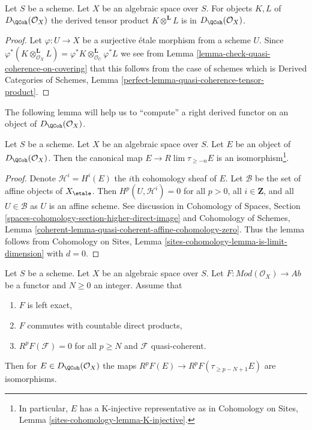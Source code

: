 \begin{lemma}
\label{lemma-quasi-coherence-tensor-product}
Let $S$ be a scheme. Let $X$ be an algebraic space over $S$.
For objects $K, L$ of $D_\QCoh(\mathcal{O}_X)$
the derived tensor product $K \otimes^\mathbf{L} L$ is in
$D_\QCoh(\mathcal{O}_X)$.
\end{lemma}

\begin{proof}
Let $\varphi : U \to X$ be a surjective \'etale morphism from a scheme $U$.
Since
$\varphi^*(K \otimes_{\mathcal{O}_X}^\mathbf{L} L) =
\varphi^*K \otimes_{\mathcal{O}_U}^\mathbf{L} \varphi^*L$
we see from
Lemma \ref{lemma-check-quasi-coherence-on-covering}
that this follows from the case of schemes which is
Derived Categories of Schemes, Lemma
\ref{perfect-lemma-quasi-coherence-tensor-product}.
\end{proof}

\noindent
The following lemma will help us to ``compute'' a right derived functor
on an object of $D_\QCoh(\mathcal{O}_X)$.

\begin{lemma}
\label{lemma-nice-K-injective}
Let $S$ be a scheme. Let $X$ be an algebraic space over $S$. Let $E$ be an
object of $D_\QCoh(\mathcal{O}_X)$. Then the canonical map
$E \to R\lim \tau_{\geq -n}E$ is an isomorphism\footnote{In particular,
$E$ has a K-injective representative as in
Cohomology on Sites, Lemma \ref{sites-cohomology-lemma-K-injective}.}.
\end{lemma}

\begin{proof}
Denote $\mathcal{H}^i = H^i(E)$ the $i$th cohomology sheaf of $E$.
Let $\mathcal{B}$ be the set of affine objects of $X_\etale$.
Then $H^p(U, \mathcal{H}^i) = 0$ for all $p > 0$, all $i \in \mathbf{Z}$,
and all $U \in \mathcal{B}$ as $U$ is an affine scheme.
See discussion in
Cohomology of Spaces, Section
\ref{spaces-cohomology-section-higher-direct-image}
and
Cohomology of Schemes, Lemma
\ref{coherent-lemma-quasi-coherent-affine-cohomology-zero}.
Thus the lemma follows from
Cohomology on Sites, Lemma \ref{sites-cohomology-lemma-is-limit-dimension}
with $d = 0$.
\end{proof}

\begin{lemma}
\label{lemma-application-nice-K-injective}
Let $S$ be a scheme. Let $X$ be an algebraic space over $S$.
Let $F : \textit{Mod}(\mathcal{O}_X) \to \textit{Ab}$
be a functor and $N \geq 0$ an integer. Assume that
\begin{enumerate}
\item $F$ is left exact,
\item $F$ commutes with countable direct products,
\item $R^pF(\mathcal{F}) = 0$ for all $p \geq N$ and $\mathcal{F}$
quasi-coherent.
\end{enumerate}
Then for $E \in D_\QCoh(\mathcal{O}_X)$ the maps
$R^pF(E) \to R^pF(\tau_{\geq p - N + 1}E)$ are isomorphisms.
\end{lemma}

